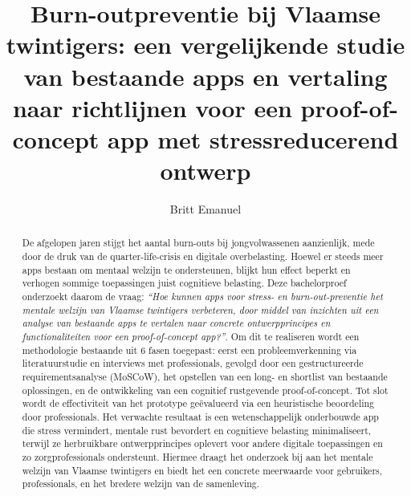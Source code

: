 \documentclass{hogent-article}
\title{Burn-outpreventie bij Vlaamse twintigers: een vergelijkende studie van bestaande apps en vertaling naar richtlijnen voor een proof-of-concept app met stressreducerend ontwerp}
\author{Britt Emanuel}
\begin{document}
    
\begin{abstract}
    De afgelopen jaren stijgt het aantal burn-outs bij jongvolwassenen aanzienlijk, mede door de druk van de quarter-life-crisis en digitale overbelasting. Hoewel er steeds meer apps bestaan om mentaal welzijn te ondersteunen, blijkt hun effect beperkt en verhogen sommige toepassingen juist cognitieve belasting. Deze bachelorproef onderzoekt daarom de vraag: \emph{“Hoe kunnen apps voor stress- en burn-out-preventie het mentale welzijn van Vlaamse twintigers verbeteren, door middel van inzichten uit een analyse van bestaande apps te vertalen naar concrete ontwerpprincipes en functionaliteiten voor een proof-of-concept app?”}. Om dit te realiseren wordt een methodologie bestaande uit 6 fasen toegepast: eerst een probleemverkenning via literatuurstudie en interviews met professionals, gevolgd door een gestructureerde requirementsanalyse (MoSCoW), het opstellen van een long- en shortlist van bestaande oplossingen, en de ontwikkeling van een cognitief rustgevende proof-of-concept. Tot slot wordt de effectiviteit van het prototype geëvalueerd via een heuristische beoordeling door professionals. Het verwachte resultaat is een wetenschappelijk onderbouwde app die stress vermindert, mentale rust bevordert en cognitieve belasting minimaliseert, terwijl ze herbruikbare ontwerpprincipes oplevert voor andere digitale toepassingen en zo zorgprofessionals ondersteunt. Hiermee draagt het onderzoek bij aan het mentale welzijn van Vlaamse twintigers en biedt het een concrete meerwaarde voor gebruikers, professionals, en het bredere welzijn van de samenleving.
\end{abstract}

\tableofcontents



\printbibliography[heading=bibintoc]
\end{document}
